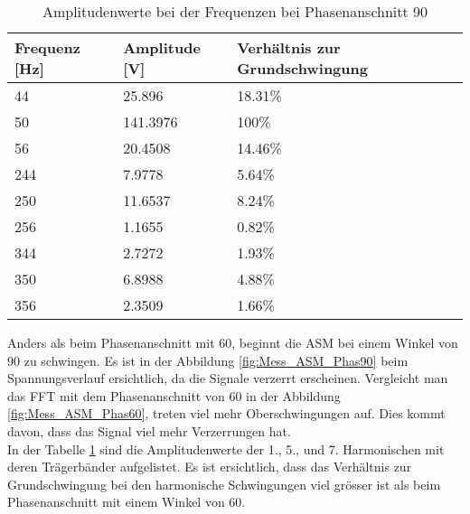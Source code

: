 \begin{table}[ht!]
	\centering
	\begin{tabular}{|l|l|l|}
		\hline
		Frequenz {[}Hz{]} & Amplitude {[}V{]} & Verhältnis zur Grundschwingung \\ \hline
		44                & 25.896            & 18.31\%                        \\ \hline
		50                & 141.3976          & 100\%                          \\ \hline
		56                & 20.4508           & 14.46\%                        \\ \hline
		244               & 7.9778            & 5.64\%                         \\ \hline
		250               & 11.6537           & 8.24\%                         \\ \hline
		256               & 1.1655            & 0.82\%                         \\ \hline
		344               & 2.7272            & 1.93\%                         \\ \hline
		350               & 6.8988            & 4.88\%                         \\ \hline
		356               & 2.3509            & 1.66\%                         \\ \hline
	\end{tabular}
\caption{Amplitudenwerte bei der Frequenzen bei Phasenanschnitt 90\textdegree}\label{tab:Mess_Spannung_ASM_Phas90}
\end{table}


Anders als beim Phasenanschnitt mit 60\textdegree, beginnt die ASM bei einem Winkel von 90\textdegree \hspace{0.02cm} zu schwingen. Es ist in der Abbildung \ref{fig:Mess_ASM_Phas90} beim Spannungsverlauf ersichtlich, da die Signale verzerrt erscheinen. Vergleicht man das FFT mit dem Phasenanschnitt von 60\textdegree \hspace{0.02cm} in der Abbildung \ref{fig:Mess_ASM_Phas60}, treten viel mehr Oberschwingungen auf. Dies kommt davon, dass das Signal viel mehr Verzerrungen hat.\\
In der Tabelle \ref{tab:Mess_Spannung_ASM_Phas90} sind die Amplitudenwerte der 1., 5., und 7. Harmonischen mit deren Trägerbänder aufgelistet. Es ist ersichtlich, dass das Verhältnis zur Grundschwingung bei den harmonische Schwingungen viel grösser ist als beim Phasenanschnitt mit einem Winkel von 60\textdegree. 

\newpage
